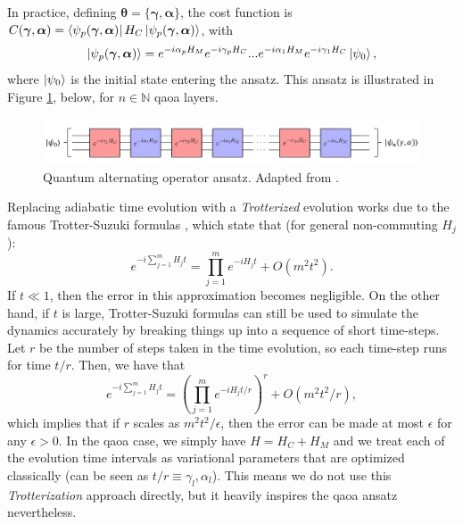 In practice, defining $\boldsymbol{\theta} = \{\boldsymbol{\gamma}, \boldsymbol{\alpha}\}$, the cost function is $C(\boldsymbol{\gamma}, \boldsymbol{\alpha}) = \bra{\psi_p(\boldsymbol{\gamma}, \boldsymbol{\alpha})}H_C\ket{\psi_p(\boldsymbol{\gamma}, \boldsymbol{\alpha})}$, with
\begin{equation}\label{eq:Psi_p}
    \ket{\psi_p(\boldsymbol{\gamma}, \boldsymbol{\alpha})} = e^{-i\alpha_pH_M}e^{-i\gamma_pH_C} ... e^{-i\alpha_1H_M}e^{-i\gamma_1H_C}\ket{\psi_0},
\end{equation}
where $\ket{\psi_0}$ is the initial state entering the ansatz. This ansatz is illustrated in Figure \ref{fig:QAOA_Trotterization}, below, for $n \in \mathbb{N}$ \acrshort{qaoa} layers.
\begin{figure}[H]
    \centering
    \includegraphics[width = \linewidth]{Figures/Diagrams/QAOA_Trotterization.png}
    \caption{Quantum alternating operator ansatz. Adapted from \cite{Intro_QAOA}.}
    \label{fig:QAOA_Trotterization}
\end{figure}
\noindent Replacing adiabatic time evolution with a \textit{Trotterized} evolution works due to the famous Trotter-Suzuki formulas \cite{nielsen2010quantum}, which state that (for general non-commuting $H_j$):
\begin{equation}
    e^{-i\sum_{j=1}^{m}H_{j}t}=\prod_{j=1}^{m}e^{-i H_{j}t}+O(m^{2}t^{2}).
\end{equation}
If $t \ll 1$, then the error in this approximation becomes negligible. On the other hand, if $t$ is large, Trotter-Suzuki formulas can still be used to simulate the dynamics accurately by breaking things up into a sequence of short time-steps. Let $r$ be the number of steps taken in the time evolution, so each time-step runs for time $t/r$. Then, we have that
\begin{equation}
    e^{-i\sum_{j=1}^{m}H_{j}t}=\left(\prod_{j=1}^{m}e^{-i H_{j}t/r}\right)^{r}+O(m^{2}t^{2}/r),
\end{equation}
which implies that if $r$ scales as $m^2t^2/\epsilon$, then the error can be made at most $\epsilon$ for any $\epsilon > 0$. In the \acrshort{qaoa} case, we simply have $H = H_C + H_M$ and we treat each of the evolution time intervals as variational parameters that are optimized classically (can be seen as $t/r \equiv \gamma_l, \alpha_l$). This means we do not use this \textit{Trotterization} approach directly, but it heavily inspires the \acrshort{qaoa} ansatz nevertheless. 

